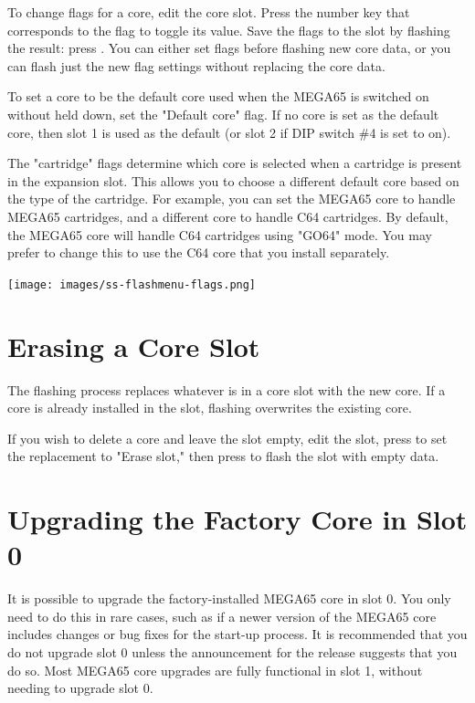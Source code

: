 To change flags for a core, edit the core slot. Press the number key that corresponds to the flag to toggle its value. Save the flags to the slot by flashing the result: press . You can either set flags before flashing new core data, or you can flash just the new flag settings without replacing the core data.

To set a core to be the default core used when the MEGA65 is switched on without  held down, set the "Default core" flag. If no core is set as the default core, then slot 1 is used as the default (or slot 2 if DIP switch \#4 is set to on).

The "cartridge" flags determine which core is selected when a cartridge is present in the expansion slot. This allows you to choose a different default core based on the type of the cartridge. For example, you can set the MEGA65 core to handle MEGA65 cartridges, and a different core to handle C64 cartridges. By default, the MEGA65 core will handle C64 cartridges using "GO64" mode. You may prefer to change this to use the C64 core that you install separately.

\begin{center}
  \texttt{[image: images/ss-flashmenu-flags.png]}
\end{center}

\section{Erasing a Core Slot}

The flashing process replaces whatever is in a core slot with the new core. If a core is already installed in the slot, flashing overwrites the existing core.

If you wish to delete a core and leave the slot empty, edit the slot, press  to set the replacement to "Erase slot," then press  to flash the slot with empty data.

\section{Upgrading the Factory Core in Slot 0}

It is possible to upgrade the factory-installed MEGA65 core in slot 0. You only need to do this in rare cases, such as if a newer version of the MEGA65 core includes changes or bug fixes for the start-up process. It is recommended that you do not upgrade slot 0 unless the announcement for the release suggests that you do so. Most MEGA65 core upgrades are fully functional in slot 1, without needing to upgrade slot 0.

